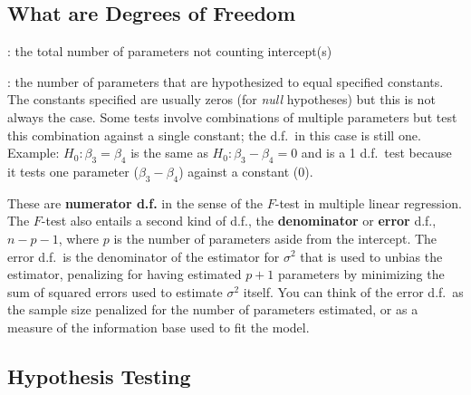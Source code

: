 \subsection{What are Degrees of Freedom}
\bd
\item[For a model]: the total number of parameters not counting
  intercept(s)
\item[For a hypothesis test]: the number of parameters that are
  hypothesized to equal specified constants.  The constants specified
  are usually zeros (for \emph{null} hypotheses) but this is not
  always the case.  Some tests involve combinations of multiple
  parameters but test this combination against a single constant; the
  d.f.\ in this case is still one.  Example: $H_{0}:
  \beta_{3}=\beta_{4}$ is the same as $H_{0}:\beta_{3}-\beta_{4}=0$
  and is a 1 d.f.\ test because it tests one parameter
  ($\beta_{3}-\beta_{4}$) against a constant ($0$).
\ed

These are \textbf{numerator d.f.} in the sense of the $F$-test in
multiple linear regression.  The $F$-test also entails a second kind
of d.f., the \textbf{denominator} or \textbf{error} d.f., $n-p-1$,
where $p$ is the number of parameters aside from the intercept.  The
error d.f.\ is the denominator of the estimator for $\sigma^2$ that is
used to unbias the estimator, penalizing for having estimated $p+1$
parameters by minimizing the sum of squared errors used to estimate
$\sigma^2$ itself.  You can think of the error d.f.\ as the sample
size penalized for the number of parameters estimated, or as a measure
of the information base used to fit the model.

\subsection{Hypothesis Testing} 
